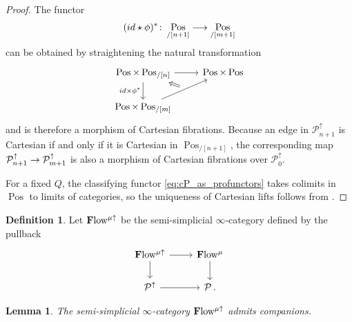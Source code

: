 \documentclass[10pt]{amsart}
\numberwithin{equation}{section}
\newtheorem{lem}[prop]{Lemma}
\theoremstyle{definition}
\newtheorem{definition}[prop]{Definition}
\DeclareMathOperator{\Pos}{Pos}
\newcommand{\bfPreFlow}{\mathbf{F}\mathrm{low}\vphantom{w}}
\newcommand{\cP}{\mathcal{P}}
\newcommand{\join}{\star}
\renewcommand{\to}{\mathchoice{\longrightarrow}{\rightarrow}{}{}}
\begin{document}
\begin{proof}
	The functor
	\begin{align*}
		(id\join \phi)^{*}\colon \Pos_{/[n+1]} \to \Pos_{/[m+1]}
	\end{align*}
	can be obtained by straightening the natural transformation
	\begin{equation*}
		\begin{tikzcd}
			\Pos\times \Pos_{/[n]} \arrow[r] \arrow[d, "id \times \phi^{*}"']      &   \Pos \times \Pos  \\
			\Pos \times \Pos_{/[m]}  \arrow[ur, ""{name=S}]
			\arrow[Rightarrow, from=S, to=1-1]
		\end{tikzcd}
	\end{equation*}
	and is therefore a morphism of Cartesian fibrations.
  Because an edge in $\cP^{\uparrow}_{n+1}$ is Cartesian if and only if it is Cartesian in $\Pos_{/[n+1]}$, the corresponding map $\cP_{n+1}^{\uparrow} \to \cP_{m+1}^{\uparrow}$ is also a morphism of Cartesian fibrations over $\cP^{\uparrow}_{0}$.

	For a fixed $Q$, the classifying functor \eqref{eq:cP_as_profunctors} takes colimits in $\Pos$ to limits of categories, so the uniqueness of Cartesian lifts follows from .
\end{proof}
\begin{definition}\label{def:Flow_uparrow}
	Let $\bfPreFlow^{\mu\uparrow}$ be the semi-simplicial $\infty$-category defined by the pullback
	\begin{equation*}
		\begin{tikzcd}
			\bfPreFlow^{\mu \uparrow} \arrow[r] \arrow[d]      &   \bfPreFlow^{\mu}  \arrow[d] \\
			\cP^{\uparrow}  \arrow[r]               &   \cP \,.
		\end{tikzcd}
	\end{equation*}
\end{definition}
\begin{lem}\label{lem:Flow_has_companions}
	The semi-simplicial $\infty$-category $\bfPreFlow^{\mu \uparrow}$ admits companions.
\end{lem}
\end{document}
